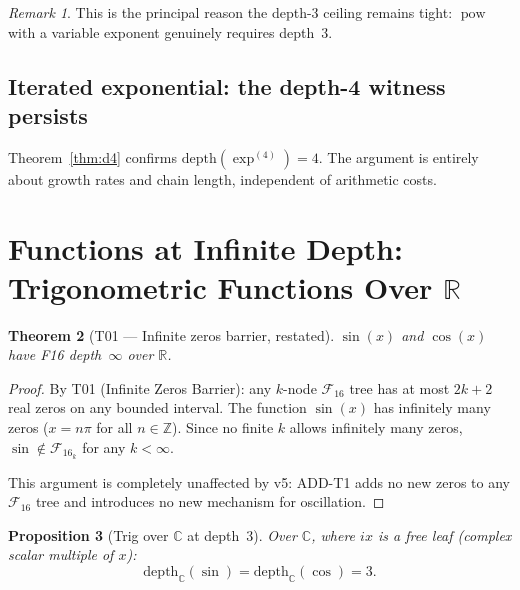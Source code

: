 \documentclass[12pt,a4paper]{article}
\newtheorem{theorem}{Theorem}[section]
\newtheorem{proposition}[theorem]{Proposition}
\theoremstyle{definition}
\theoremstyle{remark}
\newtheorem{remark}[theorem]{Remark}
\newcommand{\powop}{\operatorname{pow}}
\newcommand{\F}{\mathcal{F}_{16}}
\newcommand{\R}{\mathbb{R}}
\newcommand{\C}{\mathbb{C}}
\begin{document}
\begin{remark}
This is the principal reason the depth-3 ceiling remains tight: $\powop$
with a variable exponent genuinely requires depth~$3$.
\end{remark}

\subsection{Iterated exponential: the depth-4 witness persists}

Theorem~\ref{thm:d4} confirms $\mathrm{depth}(\exp^{(4)}) = 4$.
The argument is entirely about growth rates and chain length, independent of
arithmetic costs.

\section{Functions at Infinite Depth: Trigonometric Functions Over $\R$}
\label{sec:trig}

\begin{theorem}[T01 — Infinite zeros barrier, restated]
\label{thm:t01}
$\sin(x)$ and $\cos(x)$ have F16 depth~$\infty$ over $\R$.
\end{theorem}

\begin{proof}
By T01 (Infinite Zeros Barrier): any $k$-node $\F$ tree has at most $2k+2$
real zeros on any bounded interval.  The function $\sin(x)$ has infinitely many
zeros ($x = n\pi$ for all $n\in\mathbb{Z}$).  Since no finite $k$ allows
infinitely many zeros, $\sin \notin \F_k$ for any $k < \infty$.

This argument is completely unaffected by v5: ADD-T1 adds no new zeros to any
$\F$ tree and introduces no new mechanism for oscillation.
\end{proof}

\begin{proposition}[Trig over $\C$ at depth~$3$]
Over $\C$, where $ix$ is a free leaf (complex scalar multiple of $x$):
\[
  \mathrm{depth}_\C(\sin) = \mathrm{depth}_\C(\cos) = 3.
\]
\end{proposition}
\end{document}
